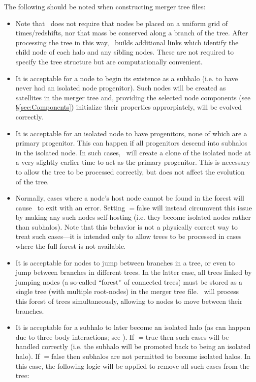 The following should be noted when constructing merger tree files:
\begin{itemize}
\item Note that \glc\ does not require that nodes be placed on a uniform grid of times/redshifts, nor that mass be conserved along a branch of the tree. After processing the tree in this way, \glc\ builds additional links which identify the child node of each halo and any sibling nodes. These are not required to specify the tree structure but are computationally convenient.
\item It is acceptable for a node to begin its existence as a subhalo (i.e. to have never had an isolated node progenitor). Such nodes will be created as satellites in the merger tree and, providing the selected node components (see \S\ref{sec:Components}) initialize their properties approrpiately, will be evolved correctly.
\item It is acceptable for an isolated node to have progenitors, none of which are a primary progenitor. This can happen if all progenitors descend into subhalos in the isolated node. In such cases, \glc\ will create a clone of the isolated node at a very slightly earlier time to act as the primary progenitor. This is necessary to allow the tree to be processed correctly, but does not affect the evolution of the tree.
\item Normally, cases where a node's host node cannot be found in the \gls{forest} will cause \glc\ to exit with an error. Setting {\normalfont \ttfamily [mergerTreeReadMissingHostsAreFatal]}$=${\normalfont \ttfamily false} will instead circumvent this issue by making any such nodes self-hosting (i.e. they become isolated nodes rather than subhalos). Note that this behavior is not a physically correct way to treat such cases---it is intended only to allow trees to be processed in cases where the full \gls{forest} is not available.
\item It is acceptable for nodes to jump between branches in a tree, or even to jump between branches in different trees. In the latter case, all trees linked by jumping nodes (a so-called ``\gls{forest}'' of connected trees) must be stored as a single tree (with multiple root-nodes) in the merger tree file. \glc\ will process this \gls{forest} of trees simultaneously, allowing to nodes to move between their branches.
\item It is acceptable for a subhalo to later become an isolated halo (as can happen due to three-body interactions; see  \citealt{sales_cosmic_2007}). If {\normalfont \ttfamily [mergerTreeReadAllowSubhaloPromotions]}$=${\normalfont \ttfamily true} then such cases will be handled correctly (i.e. the subhalo will be promoted back to being an isolated halo). If {\normalfont \ttfamily [mergerTreeReadAllowSubhaloPromotions]}$=${\normalfont \ttfamily false} then subhalos are not permitted to become isolated halos. In this case, the following logic will be applied to remove all such cases from the tree:\\


\end{itemize}
